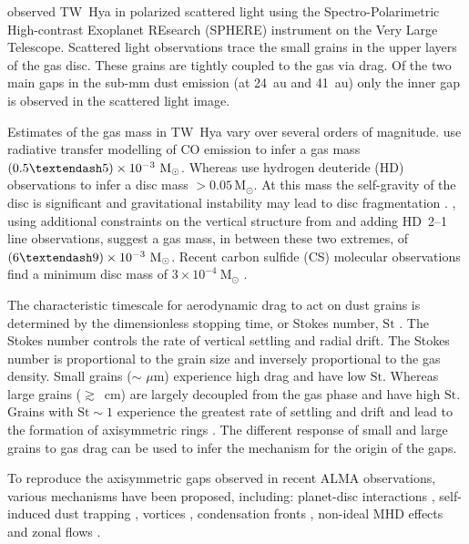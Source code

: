 \documentclass[usenatbib,a4paper,times]{mnras}
\newcommand{\st}{\mathrm{St}}
\renewcommand{\sun}{\mathrm{M}_{\odot}}
\begin{document}
\citet{van-boekel:2017} observed TW~Hya in polarized scattered light using the
Spectro-Polarimetric High-contrast Exoplanet REsearch (SPHERE) instrument on the
Very Large Telescope. Scattered light observations trace the small grains in the
upper layers of the gas disc. These grains are tightly coupled to the gas via
drag. Of the two main gaps in the sub-mm dust emission (at 24~au and 41~au) only
the inner gap is observed in the scattered light image.

Estimates of the gas mass in TW~Hya vary over several orders of magnitude.
\citet{thi:2010} use radiative transfer modelling of CO emission to infer a gas
mass $(0.5\textendash 5)\times10^{-3}~\sun{}$. Whereas \citet{bergin:2013} use
hydrogen deuteride (HD) observations to infer a disc mass $>0.05\,\sun{}$. At
this mass the self-gravity of the disc is significant and gravitational
instability may lead to disc fragmentation \citep{kratter:2016}.
\citet{trapman:2017}, using additional constraints on the vertical structure
from \citet{kama:2016} and adding HD~2--1 line observations, suggest a gas mass,
in between these two extremes, of $(6\textendash 9)\times10^{-3}~\sun{}$. Recent
carbon sulfide (CS) molecular observations find a minimum disc mass of
$3\times10^{-4}~\sun{}$ \citep{teague:2018a}.

The characteristic timescale for aerodynamic drag to act on dust grains is
determined by the dimensionless stopping time, or Stokes number, $\st{}$
\citep{weidenschilling:1977, takeuchi:2002}. The Stokes number controls the rate
of vertical settling and radial drift. The Stokes number is proportional to the
grain size and inversely proportional to the gas density. Small grains ($\sim$
$\mu$m) experience high drag and have low $\st{}$. Whereas large grains
($\gtrsim$~cm) are largely decoupled from the gas phase and have high $\st{}$.
Grains with $\st{}\sim1$ experience the greatest rate of settling and drift and
lead to the formation of axisymmetric rings \citep{ayliffe:2012, dipierro:2015}.
The different response of small and large grains to gas drag can be used to
infer the mechanism for the origin of the gaps.

To reproduce the axisymmetric gaps observed in recent ALMA observations, various
mechanisms have been proposed, including: planet-disc interactions
\citep{dipierro:2015}, self-induced dust trapping \citep{gonzalez:2017},
vortices \citep{zhu:2014}, condensation fronts \citep{zhang:2015}, non-ideal MHD
effects \citep{bethune:2016} and zonal flows \citep{johansen:2009,flock:2015}.
\end{document}
